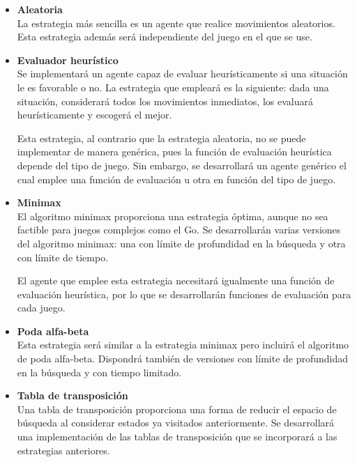\documentclass[a4paper,12pt]{article}
\begin{document}
\begin{itemize}
	\item \textbf{Aleatoria}\\
	La estrategia más sencilla es un agente que realice movimientos aleatorios.
	Esta estrategia además será independiente del juego en el que se use.

	\item \textbf{Evaluador heurístico}\\
	Se implementará un agente capaz de evaluar heurísticamente si una situación le es favorable o no.
	La estrategia que empleará es la siguiente: dada una situación, considerará todos los movimientos inmediatos, los evaluará heurísticamente y escogerá el mejor.
	\par 
	Esta estrategia, al contrario que la estrategia aleatoria, no se puede implementar de manera genérica, pues la función de evaluación heurística depende del tipo de juego.
	Sin embargo, se desarrollará un agente genérico el cual emplee una función de evaluación u otra en función del tipo de juego.

	\item \textbf{Minimax}\\
	El algoritmo minimax proporciona una estrategia óptima, aunque no sea factible para juegos complejos como el Go.
	Se desarrollarán varias versiones del algoritmo minimax: una con límite de profundidad en la búsqueda y otra con límite de tiempo.
	\par 
	El agente que emplee esta estrategia necesitará igualmente una función de evaluación heurística, por lo que se desarrollarán funciones de evaluación para cada juego.

	\item \textbf{Poda alfa-beta}\\
	Esta estrategia será similar a la estrategia minimax pero incluirá el algoritmo de poda alfa-beta.
	Dispondrá también de versiones con límite de profundidad en la búsqueda y con tiempo limitado.
	
	\item \textbf{Tabla de transposición}\\
	Una tabla de transposición proporciona una forma de reducir el espacio de búsqueda al considerar estados ya visitados anteriormente.
	Se desarrollará una implementación de las tablas de transposición que se incorporará a las estrategias anteriores.
	

\end{itemize}
\end{document}
